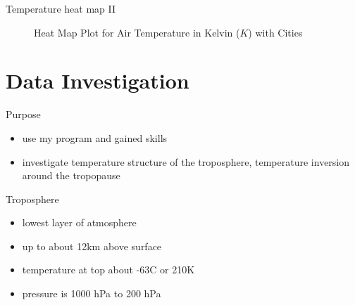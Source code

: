 \documentclass[
    hyperref={
        final,
        colorlinks=true,
        menucolor=black,
        anchorcolor=green,
        linkcolor=blue,
        citecolor=red,
        pdftitle={RS RAS Internship Presentation},
        pdfauthor={Moritz M. Konarski}
    }
]{beamer}
\begin{document}
\begin{frame}{Temperature heat map II}
\begin{figure}
    \vspace{-7pt}
    \caption{Heat Map Plot for Air Temperature in Kelvin ($K$) with Cities}
\end{figure}
\end{frame}

\section{Data Investigation}

\begin{frame}{Purpose}
    \begin{itemize}
        \item use my program and gained skills 
        \item investigate temperature structure of the troposphere, temperature
            inversion around the tropopause
    \end{itemize}
\end{frame}

\begin{frame}{Troposphere}
    \begin{itemize}
        \item lowest layer of atmosphere
        \item up to about 12km above surface
        \item temperature at top about -63\textdegree{}C or 210K 
            \cite{tropopause}
        \item pressure is 1000 hPa to 200 hPa \cite{pressure}
    \end{itemize}
\end{frame}
\end{document}

